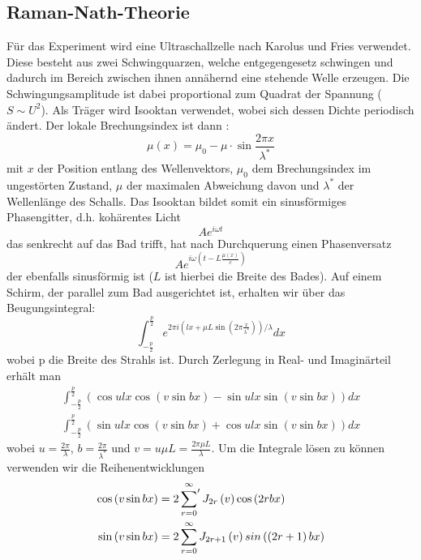 \subsection{Raman-Nath-Theorie}
Für das Experiment wird eine Ultraschallzelle nach Karolus und Fries \cite{Karolus} verwendet. Diese besteht aus zwei Schwingquarzen, welche entgegengesetz schwingen und dadurch im Bereich zwischen ihnen annähernd eine stehende Welle erzeugen. Die Schwingungsamplitude ist dabei proportional zum Quadrat der Spannung ( $S \sim U^2$). Als Träger wird Isooktan verwendet, wobei sich dessen Dichte periodisch ändert. Der lokale Brechungsindex ist dann \cite{Raman}: 
\begin{equation}
 \mu \left( x \right) = \mu_0 - \mu \cdot \sin \frac{2 \pi x}{ \lambda^*}
\end{equation}
mit $x$ der Position entlang des Wellenvektors, $\mu_0$ dem Brechungsindex im ungestörten Zustand, $\mu$ der maximalen Abweichung davon und $\lambda^*$ der Wellenlänge des Schalls. Das Isooktan bildet somit ein sinusförmiges Phasengitter, d.h. kohärentes Licht
\begin{equation}
 A e^{i \omega t}
\end{equation}
das senkrecht auf das Bad trifft, hat nach Durchquerung einen Phasenversatz
\begin{equation}
 A e^{i \omega \left( t - L \frac{\mu \left( x \right)}{c} \right)}
\end{equation}
der ebenfalls sinusförmig ist ($L$ ist hierbei die Breite des Bades). 
Auf einem Schirm, der parallel zum Bad ausgerichtet ist, erhalten wir über das Beugungsintegral:
\begin{equation}
 \int_{-\frac{p}{2}}^{\frac{p}{2}} e^{2 \pi i \left( l x + \mu L \sin \left( 2 \pi \frac{x}{\lambda^*} \right) \right) / \lambda } dx
\end{equation}
wobei p die Breite des Strahls ist. Durch Zerlegung in Real- und Imaginärteil erhält man
\begin{align}
 \int_{-\frac{p}{2}}^{\frac{p}{2}} \left( \cos ulx \cos \left( v \sin bx \right) - \sin ulx \sin \left( v \sin bx \right) \right) dx \\
\int_{-\frac{p}{2}}^{\frac{p}{2}} \left( \sin ulx \cos \left( v \sin bx \right) + \cos ulx \sin \left( v \sin bx \right) \right) dx
\end{align}
wobei $u = \frac{2 \pi}{\lambda}$, $b = \frac{2 \pi}{\lambda^*}$ und $v= u \mu L = \frac{2 \pi \mu L}{\lambda}$.
Um die Integrale lösen zu können verwenden wir die Reihenentwicklungen
\begin{align}
 \cos \left( v \sin bx \right) & =  2 \sideset{}{'} \sum_{r=0}^{\infty} J_{2r} \left( v \right) \cos \left( 2rbx \right) \\
 \sin \left( v \sin bx \right) & =  2 \sum_{r=0}^{\infty} J_{2r+1} \left( v \right) sin \left( \left( 2r+1 \right) bx \right)
\end{align}
